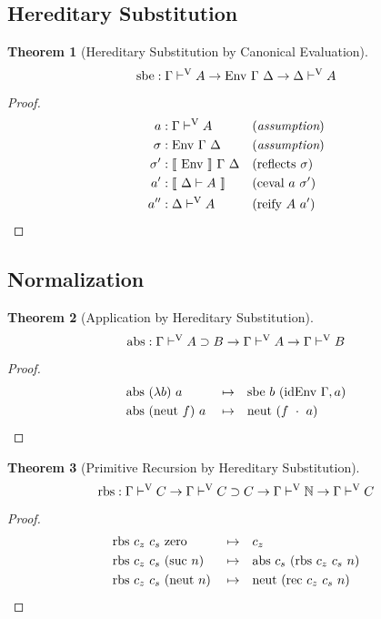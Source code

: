 \documentclass[preprint,nonatbib]{sigplanconf}
\numberwithin{subdefin}{defin}
\theoremstyle{definition}
\newtheorem{theorem}{Theorem}
\numberwithin{subtheorem}{theorem}
\numberwithin{sublemma}{theorem}
\numberwithin{corollary}{theorem}
\numberwithin{case}{theorem}
\numberwithin{slcase}{sublemma}
\numberwithin{scase}{subtheorem}
\numberwithin{lcase}{lemma}
\def\dfn{\mapsto}
\def\arr{\supset}
\def\marr{\rightarrow}
\def\app{\cdot}
\def\lam{\lambda}
\def\nat{\mathbb{N}}
\def\zero{\con{zero}}
\def\suc{\con{suc}}
\def\neut{\con{neut}}
\def\rec{\fun{rec}}
\def\rbs{\fun{rbs}}
\def\abs{\fun{abs}}
\def\reify{\fun{reify}}
\def\reflects{\fun{reflects}}
\def\cevalv{\fun{ceval}}
\def\sbe{\fun{sbe}}
\def\idenv{\fun{idEnv}}
\def\byass{(\textit{assumption})}
\newcommand{\by}[1]{(#1)}
\newcommand{\turn}[1]{\vdash^\con{#1}}
\newcommand{\el}[1]{\llbracket ~ #1 ~ \rrbracket}
\newcommand{\con}[1]{\textmd{#1}}
\newcommand{\fun}[1]{\textmd{#1}}
\newcommand{\dtypm}[1]{\el{\Delta \vdash #1}}
\newcommand{\typv}[1]{\Gamma \turn{V} #1}
\newcommand{\dtypv}[1]{\Delta \turn{V} #1}
\def\menv{\el{\fun{Env}}~\Gamma~\Delta}
\def\env{\fun{Env}~\Gamma~\Delta}
\begin{document}
\subsection{Hereditary Substitution}

\begin{theorem}[Hereditary Substitution by Canonical Evaluation]
\label{thm:mod:vhsub}
$$
\sbe : \typv{A} \marr \env \marr \dtypv{A}
$$

\begin{proof}
\begin{align*}
a    &: \typv{A} && \byass\\
\sigma   &: \env && \byass\\
\sigma'  &: \menv && \by{\reflects~\sigma}\\
a'   &: \dtypm{A} && \by{\cevalv~a~\sigma'}\\
a''  &: \dtypv{A} && \by{\reify~A~a'}
\end{align*}
\end{proof}

\end{theorem}

\subsection{Normalization}

\begin{theorem}[Application by Hereditary Substitution]
\label{thm:mod:abs}
$$
\abs : \typv{A \arr B} \marr \typv{A} \marr \typv{B}
$$

\begin{proof}
\begin{align*}
&\abs ~ (\lam b) ~ a &&\dfn&& \sbe~b~(\idenv~\Gamma, a)\\
&\abs ~ (\neut~f) ~ a &&\dfn&& \neut~(f~\app~a)
\end{align*}
\end{proof}

\end{theorem}

\begin{theorem}[Primitive Recursion by Hereditary Substitution]
\label{thm:mod:rbs}
$$
\rbs : \typv{C} \marr \typv{C \arr C} \marr \typv{\nat} \marr \typv{C}
$$

\begin{proof}
\begin{align*}
&\rbs ~ c_z ~ c_s ~ \zero &&\dfn&& c_z\\
&\rbs ~ c_z ~ c_s ~ (\suc~n) &&\dfn&& \abs~c_s~(\rbs~c_z~c_s~n)\\
&\rbs ~ c_z ~ c_s ~ (\neut~n) &&\dfn&& \neut~(\rec~c_z~c_s~n)
\end{align*}
\end{proof}

\end{theorem}
\end{document}
